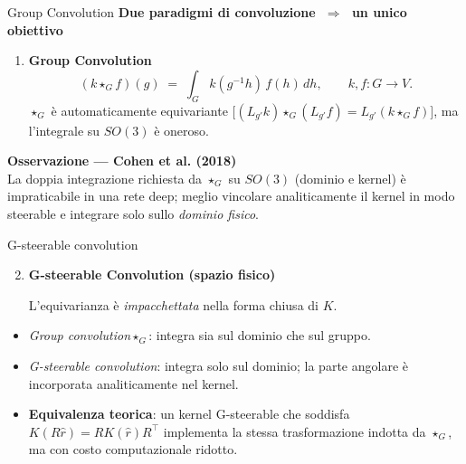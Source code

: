 \documentclass[aspectratio=64,8pt]{beamer}
\begin{document}
\begin{frame}{Group Convolution}
    \textbf{Due paradigmi di convoluzione \(\;\Rightarrow\;\) un unico obiettivo}

  \begin{enumerate}

      \item \textbf{Group Convolution}\\[2pt]
          \[
            (k\star_G f)(g)
            \;=\;
            \int_G k(g^{-1}h)\,f(h)\,dh,
            \qquad
            k,f : G \to V.
          \]
          \(\star_G\) è automaticamente equivariante \(\bigl[(L_{g'}k)\star_G(L_{g'}f)=L_{g'}(k\star_G f)\bigr]\),
          ma l’integrale su \(SO(3)\) è oneroso.
  \end{enumerate}
       \textbf{Osservazione — Cohen et al. (2018)}\\[2pt]
      La doppia integrazione richiesta da \(\star_G\) su \(SO(3)\)
      (dominio e kernel) è impraticabile in una rete deep;  
      meglio vincolare analiticamente il kernel in modo steerable
      e integrare solo sullo \emph{dominio fisico}.
\end{frame}

\begin{frame}{G-steerable convolution}
\begin{enumerate}\setcounter{enumi}{1}
  \item \textbf{G-steerable Convolution (spazio fisico)}\\[2pt]
  \centering

        L’equivarianza è \emph{impacchettata} nella forma chiusa di \(K\).

  \vspace{4pt}

\end{enumerate}
        \begin{itemize}
              \item \emph{Group convolution}\(\star_G\): integra sia sul dominio che sul gruppo.
              \item \emph{G-steerable convolution}: integra solo sul dominio; la parte angolare è incorporata 
              analiticamente nel kernel.
              \item \textbf{Equivalenza teorica}: un kernel G-steerable che soddisfa \(K(R\hat r)=R K(\hat r)R^{\!\top}\) 
              implementa la stessa trasformazione indotta da \(\star_G\), ma con costo computazionale ridotto.
        \end{itemize}
\end{frame}
\end{document}
